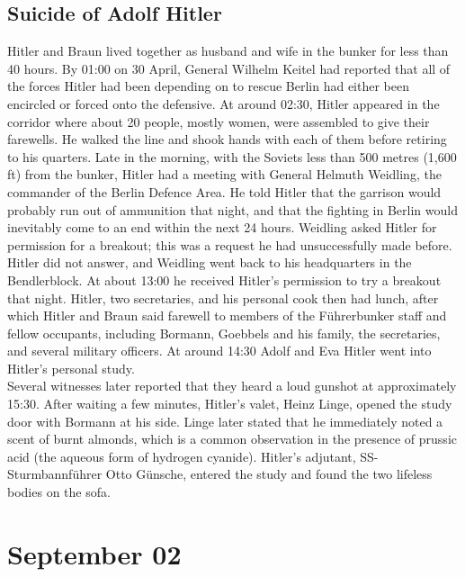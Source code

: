 \documentclass[11pt]{report}
\begin{document}
\subsection{Suicide of Adolf Hitler}
Hitler and Braun lived together as husband and wife in the bunker for less than 40 hours. By 01:00 on 30 April, General Wilhelm Keitel had reported that all of the forces Hitler had been depending on to rescue Berlin had either been encircled or forced onto the defensive. At around 02:30, Hitler appeared in the corridor where about 20 people, mostly women, were assembled to give their farewells. He walked the line and shook hands with each of them before retiring to his quarters. Late in the morning, with the Soviets less than 500 metres (1,600 ft) from the bunker, Hitler had a meeting with General Helmuth Weidling, the commander of the Berlin Defence Area. He told Hitler that the garrison would probably run out of ammunition that night, and that the fighting in Berlin would inevitably come to an end within the next 24 hours. Weidling asked Hitler for permission for a breakout; this was a request he had unsuccessfully made before. Hitler did not answer, and Weidling went back to his headquarters in the Bendlerblock. At about 13:00 he received Hitler's permission to try a breakout that night. Hitler, two secretaries, and his personal cook then had lunch, after which Hitler and Braun said farewell to members of the Führerbunker staff and fellow occupants, including Bormann, Goebbels and his family, the secretaries, and several military officers. At around 14:30 Adolf and Eva Hitler went into Hitler's personal study.\\
\indent Several witnesses later reported that they heard a loud gunshot at approximately 15:30. After waiting a few minutes, Hitler's valet, Heinz Linge, opened the study door with Bormann at his side. Linge later stated that he immediately noted a scent of burnt almonds, which is a common observation in the presence of prussic acid (the aqueous form of hydrogen cyanide). Hitler's adjutant, SS-Sturmbannführer Otto Günsche, entered the study and found the two lifeless bodies on the sofa. 
\section{September 02}
\end{document}
